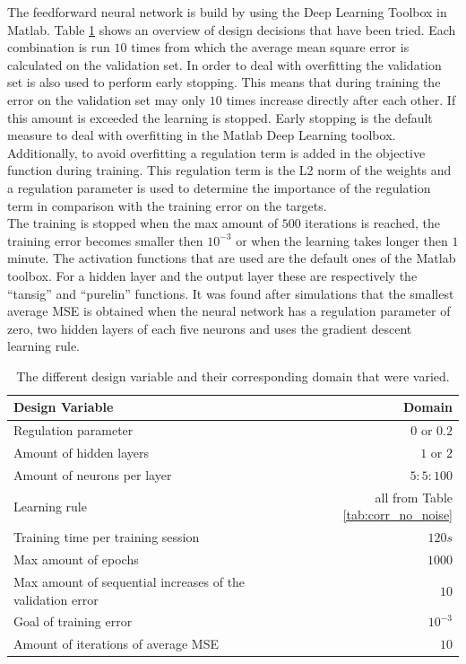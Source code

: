 \documentclass[a4paper,10pt]{article}
\begin{document}
The feedforward neural network is build by using the Deep Learning Toolbox in Matlab. Table \ref{tab:design} shows an overview of design decisions that have been tried. Each combination is run $ 10 $ times from which the average mean square error is calculated on the validation set. In order to deal with overfitting the validation set is also used to perform early stopping. This means that during training the error on the validation set may only $ 10 $ times increase directly after each other. If this amount is exceeded the learning is stopped. Early stopping is the default measure to deal with overfitting in the Matlab Deep Learning toolbox. Additionally, to avoid overfitting a regulation term is added in the objective function during training. This regulation term is the L2 norm of the weights and a regulation parameter is used to determine the importance of the regulation term in comparison with the training error on the targets.\\

 The training is stopped when the max amount of $ 500 $ iterations is reached, the training error becomes smaller then $ 10^{-3} $ or when the learning takes longer then $ 1 $ minute. The activation functions that are used are the default ones of the Matlab toolbox. For a hidden layer and the output layer these are respectively the ``tansig'' and ``purelin'' functions.
It was found after simulations that the smallest average MSE is obtained when the neural network has a regulation parameter of zero, two hidden layers of each five neurons and uses the gradient descent learning rule. \\


\begin{table}
	\centering
	\begin{tabular}{@{}lr@{}} \toprule
		\textbf{Design Variable}    & Domain \\\midrule
		Regulation parameter & $ 0 $ or $ 0.2 $  \\ 
		Amount of hidden layers & $ 1 $ or $ 2 $  \\
		Amount of neurons per layer & $ 5:5:100 $  \\
		Learning rule & all from Table \ref{tab:corr_no_noise}\\
		Training time per training session & $ 120 s $\\
		Max amount of epochs & $ 1000 $\\
		Max amount of sequential increases of the validation error & $ 10 $\\
		Goal of training error & $ 10^{-3} $\\
		Amount of iterations of average MSE & $ 10 $\\\bottomrule
	\end{tabular}
	\caption{The different design variable and their corresponding domain that were varied.}
	\label{tab:design}
\end{table}
\end{document}
